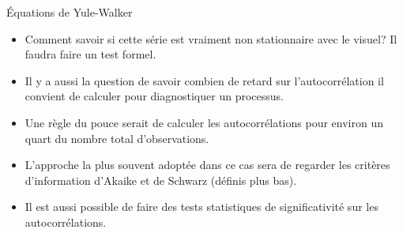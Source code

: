 \documentclass{beamer}
\begin{document}
\begin{frame}{Équations de Yule-Walker}
\begin{itemize}
\item Comment savoir si cette série est vraiment non stationnaire avec le visuel? Il faudra faire un test formel.  
\item Il y a aussi la question de savoir combien de retard sur l’autocorrélation il convient de calculer pour diagnostiquer un processus.
\item Une règle du pouce serait de calculer les autocorrélations pour environ un quart du nombre total d’observations. 
\item L’approche la plus souvent adoptée dans ce cas sera de regarder les critères d’information d’Akaike et de Schwarz (définis plus bas).
\item Il est aussi possible de faire des tests statistiques de significativité sur les autocorrélations.  
\end{itemize}
\end{frame}
\end{document}
